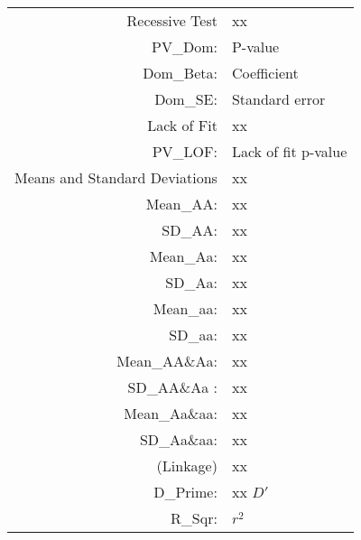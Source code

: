\begin{supertabular}{r p{5in}}
   Recessive Test & xx ~ \\
      PV\_Dom: & P-value \\
      Dom\_Beta: & Coefficient \\
      Dom\_SE: & Standard error \\[1em]

   Lack of Fit & xx ~ \\
      PV\_LOF: & Lack of fit p-value \\[1em]

   Means and Standard Deviations & xx ~ \\
      Mean\_AA: & xx \\
      SD\_AA: & xx \\
      Mean\_Aa: & xx \\
      SD\_Aa: & xx \\
      Mean\_aa: & xx \\
      SD\_aa: & xx  \\
      Mean\_AA\&Aa: & xx  \\
      SD\_AA\&Aa : & xx \\
      Mean\_Aa\&aa: & xx  \\
      SD\_Aa\&aa: & xx  \\ [1em]

   (Linkage) & xx ~ \\
      D\_Prime: & xx $D'$ \\
      R\_Sqr: & $r^2$  \\
 
\end{supertabular}
